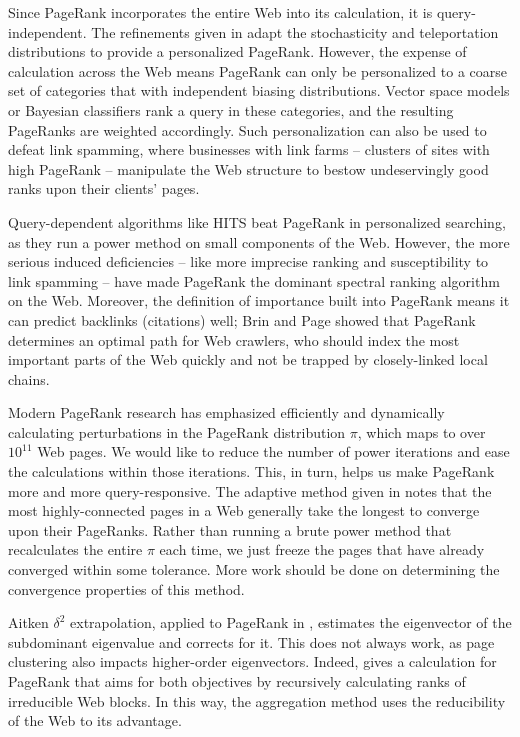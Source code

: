 \documentclass[../exploring-pagerank.tex]{subfiles}
\begin{document}
	Since PageRank incorporates the entire Web into its calculation, it is query-independent. The refinements given in \cite{haveliwalaAnalyticalComparisonApproaches2003} adapt the stochasticity and teleportation distributions to provide a personalized PageRank. However, the expense of calculation across the Web means PageRank can only be personalized to a coarse set of categories that with independent biasing distributions. Vector space models or Bayesian classifiers rank a query in these categories, and the resulting PageRanks are weighted accordingly. Such personalization can also be used to defeat link spamming, where businesses with link farms -- clusters of sites with high PageRank -- manipulate the Web structure to bestow undeservingly good ranks upon their clients' pages.
	
	Query-dependent algorithms like HITS beat PageRank in personalized searching, as they run a power method on small components of the Web. However, the more serious induced deficiencies -- like more imprecise ranking and susceptibility to link spamming -- have made PageRank the dominant spectral ranking algorithm on the Web. Moreover, the definition of importance built into PageRank means it can predict backlinks (citations) well; Brin and Page \cite{brinPageRankCitationRanking1998} showed that PageRank determines an optimal path for Web crawlers, who should index the most important parts of the Web quickly and not be trapped by closely-linked local chains.
	
	Modern PageRank research has emphasized efficiently and dynamically calculating perturbations in the PageRank distribution $\pi$, which maps to over $10^{11}$ Web pages. We would like to reduce the number of power iterations and ease the calculations within those iterations. This, in turn, helps us make PageRank more and more query-responsive. The adaptive method given in \cite{berkhinSurveyPageRankComputing2005} notes that the most highly-connected pages in a Web generally take the longest to converge upon their PageRanks. Rather than running a brute power method that recalculates the entire $\pi$ each time, we just freeze the pages that have already converged within some tolerance. More work should be done on determining the convergence properties of this method.
	
	Aitken $\delta^2$ extrapolation, applied to PageRank in \cite{langvilleGooglePageRankScience2006}, estimates the eigenvector of the subdominant eigenvalue and corrects for it. This does not always work, as page clustering also impacts higher-order eigenvectors. Indeed, \cite{kamvarExploitingBlockStructure2003} gives a calculation for PageRank that aims for both objectives by recursively calculating ranks of irreducible Web blocks. In this way, the aggregation method uses the reducibility of the Web to its advantage.
	
\end{document}
